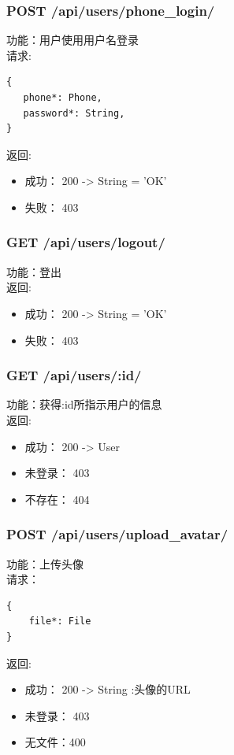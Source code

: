 \subsubsection{POST /api/users/phone\_login/}

\noindent
功能：用户使用用户名登录\\
请求:
\begin{lstlisting}[numbers=none, frame=none]
{
   phone*: Phone,
   password*: String,
}
\end{lstlisting}
返回:
\begin{itemize}
	\item 成功： 200 -> String = 'OK'
	\item 失败： 403
\end{itemize}

\subsubsection{GET /api/users/logout/}

\noindent
功能：登出\\
返回:
\begin{itemize}
	\item 成功： 200 -> String = 'OK'
	\item 失败： 403
\end{itemize}


\subsubsection{GET /api/users/:id/}

\noindent
功能：获得:id所指示用户的信息\\
返回:
\begin{itemize}
	\item 成功： 200 -> User
	\item 未登录： 403
	\item 不存在： 404
\end{itemize}



\subsubsection{POST /api/users/upload\_avatar/}

\noindent
功能：上传头像\\
请求：
\begin{lstlisting}[numbers=none, frame=none]
{
    file*: File
}
\end{lstlisting}
返回:
\begin{itemize}
	\item 成功： 200 -> String :头像的URL
	\item 未登录： 403
	\item 无文件：400
\end{itemize}



